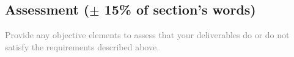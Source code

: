 \subsection{Assessment ($\pm$ 15\% of section's words)}
\textcolor{gray}{Provide any objective elements to assess that your deliverables
do or do not satisfy the requirements described above. }
